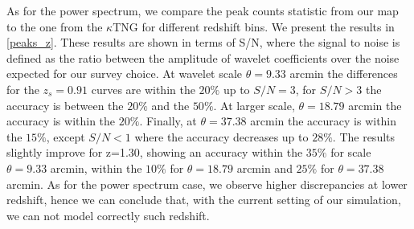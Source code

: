 \documentclass{aa}
\begin{document}
As for the power spectrum, we compare the peak counts statistic from our map to the one from the $\kappa$TNG for different redshift bins. We present the results in \autoref{peaks_z}. These results are shown in terms of S/N, where the signal to noise is defined as the ratio between the amplitude of wavelet coefficients over the noise expected for our survey choice.
At wavelet scale $\theta=9.33$ arcmin the differences for the $z_s=0.91$ curves are within the $20\%$ up to $S/N=3$, for $S/N>3$ the accuracy is between the $20\%$ and the $50\%$. At larger scale, $\theta=18.79$ arcmin the accuracy is within the $20\%$. Finally, at $\theta=37.38$ arcmin the accuracy is within the $15\%$, except $S/N<1$ where the accuracy decreases up to $28\%$.
The results slightly improve for z=1.30, showing an accuracy within the $35\%$ for scale $\theta=9.33$ arcmin,  within the $10\%$ for $\theta=18.79$ arcmin and $25\%$ for $\theta=37.38$ arcmin.
 As for the power spectrum case, we observe higher discrepancies at lower redshift, hence we can conclude that, with the current setting of our simulation, we can not model correctly such redshift.
\end{document}
